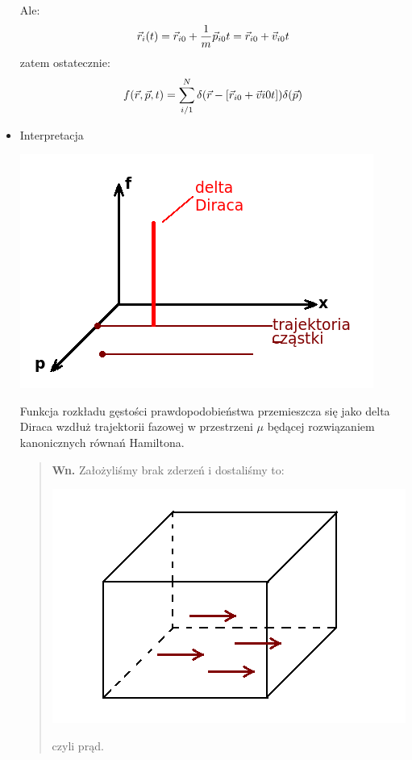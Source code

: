 \begin{itemize}
Ale:
\begin{equation}\vec{r}_i(t)=\vec{r}_{i0}+\frac{1}{m}\vec{p}_{i0}t=\vec{r}_{i0}+\vec{v}_{i0}t\end{equation}
zatem ostatecznie:
\begin{equation}f(\vec{r},\vec{p},t)=\sum_{i/1}^N\delta(\vec{r}-[\vec{r}_{i0}+\vec{v}{i0}t])\delta(\vec{p}) \end{equation}
\item{Interpretacja}\\
\begin{center}
\includegraphics[scale=0.75]{obrazki/przestrzen_fazowa3.png}
\end{center}
Funkcja rozkładu gęstości prawdopodobieństwa przemieszcza się jako delta Diraca wzdłuż trajektorii fazowej w przestrzeni $\mu$ będącej rozwiązaniem kanonicznych równań Hamiltona.\\
\begin{verse}\textbf{Wn. }Założyliśmy brak zderzeń i dostaliśmy to:
\begin{center}\includegraphics[scale=0.75]{obrazki/przestrzen_fazowa4.png}\end{center}
czyli prąd. \end{verse}
\end{itemize}

